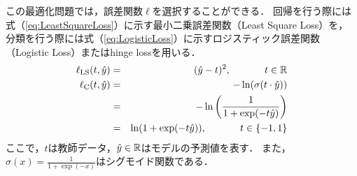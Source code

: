この最適化問題では，誤差関数$\ell$を選択することができる．
回帰を行う際には式（\ref{eq:LeastSquareLoss}）に示す最小二乗誤差関数（Least Square Loss）を，
分類を行う際には式（\ref{eq:LogisticLoss}）に示すロジスティック誤差関数（Logistic Loss）またはhinge lossを用いる．
\begin{eqnarray}
  \ell_{\rm LS}(t, \hat{y}) &=& (\hat{y} - t)^{2},\hspace{8ex} t \in \mathbb{R} \label{eq:LeastSquareLoss} \\
  \ell_{\rm C}(t, \hat{y}) &=& -\ln(\sigma(t\cdot \hat{y})) \nonumber \\
  &=& -\ln \left ( \frac{1}{1 + \exp(-t\hat{y})} \right ) \nonumber \\
  &=& \ln(1 + \exp(-t\hat{y})),\hspace{8ex}  t \in \{-1, 1\} \label{eq:LogisticLoss}
\end{eqnarray}
ここで，$t$は教師データ，$\hat{y} \in \mathbb{R}$はモデルの予測値を表す．
また，$\sigma(x) = \displaystyle \frac{1}{1 + \exp(-x)}$はシグモイド関数である．

